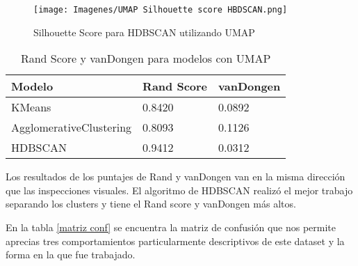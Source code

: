 \documentclass{article}
\begin{document}
\begin{figure}[!htb]
    \centering
    \texttt{[image: Imagenes/UMAP Silhouette score HBDSCAN.png]}
    \caption{Silhouette Score para HDBSCAN utilizando UMAP}
    \label{fig:UMAP Sil score}
\end{figure}


\begin{table}[!ht]
  \caption{Rand Score y vanDongen para modelos con UMAP}
  \label{Rand y Sil scores}
  \centering
  \begin{tabular}{lll}
    \toprule
    Modelo     & Rand Score     & vanDongen  \\
    \midrule
    KMeans &  0.8420 & 0.0892     \\
    AgglomerativeClustering &  0.8093 &  0.1126  \\
    HDBSCAN &  0.9412 & 0.0312  \\
    \bottomrule
  \end{tabular}
\end{table}

Los resultados de los puntajes de Rand y vanDongen van en la misma dirección que las inspecciones visuales. El algoritmo de HDBSCAN realizó el mejor trabajo separando los clusters y tiene el Rand score y vanDongen más altos.

En la tabla \ref{matriz conf} se encuentra la matriz de confusión que nos permite aprecias tres comportamientos particularmente descriptivos de este dataset y la forma en la que fue trabajado.
\end{document}
